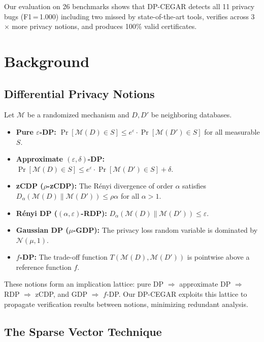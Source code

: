 \documentclass[sigplan,screen,nonacm]{acmart}
\begin{document}
\noindent Our evaluation on 26 benchmarks shows that \textsc{DP-CEGAR} detects
all 11 privacy bugs (F1\,=\,1.000) including two missed by state-of-the-art
tools, verifies across 3$\times$ more privacy notions, and produces 100\% valid
certificates.

\section{Background}
\label{sec:background}

\subsection{Differential Privacy Notions}

Let $\mathcal{M}$ be a randomized mechanism and $D, D'$ be neighboring databases.

\begin{itemize}
\item \textbf{Pure $\varepsilon$-DP:}
  $\Pr[\mathcal{M}(D) \in S] \leq e^{\varepsilon} \cdot \Pr[\mathcal{M}(D') \in S]$
  for all measurable $S$.
\item \textbf{Approximate $(\varepsilon,\delta)$-DP:}
  $\Pr[\mathcal{M}(D) \in S] \leq e^{\varepsilon} \cdot \Pr[\mathcal{M}(D') \in S] + \delta$.
\item \textbf{zCDP ($\rho$-zCDP):} The R\'{e}nyi divergence of order $\alpha$
  satisfies $D_\alpha(\mathcal{M}(D) \| \mathcal{M}(D')) \leq \rho\alpha$ for all $\alpha > 1$.
\item \textbf{R\'{e}nyi DP ($(\alpha,\varepsilon)$-RDP):}
  $D_\alpha(\mathcal{M}(D) \| \mathcal{M}(D')) \leq \varepsilon$.
\item \textbf{Gaussian DP ($\mu$-GDP):} The privacy loss random variable is
  dominated by $\mathcal{N}(\mu, 1)$.
\item \textbf{$f$-DP:} The trade-off function $T(\mathcal{M}(D), \mathcal{M}(D'))$
  is pointwise above a reference function $f$.
\end{itemize}

These notions form an implication lattice: pure DP $\Rightarrow$ approximate DP
$\Rightarrow$ RDP $\Rightarrow$ zCDP, and GDP $\Rightarrow$ $f$-DP. Our
\textsc{DP-CEGAR} exploits this lattice to propagate verification results
between notions, minimizing redundant analysis.

\subsection{The Sparse Vector Technique}
\end{document}
